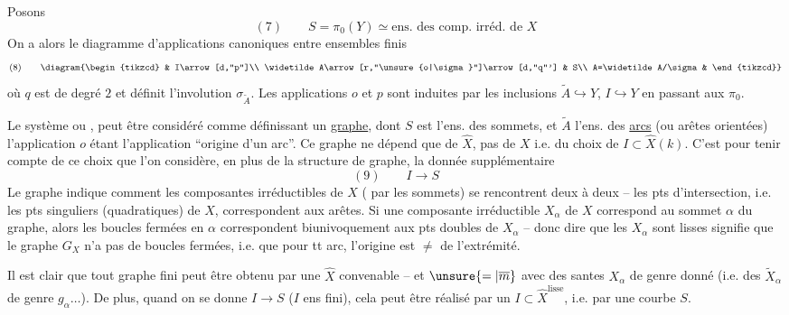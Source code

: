 Posons
\[
(7)\qquad S=\pi_0(Y)\simeq\text{ens. des comp. irréd. de }X
\]
On a alors le diagramme d'applications canoniques entre ensembles finis
\[
(8)\qquad
\diagram{\begin{tikzcd}
& I\arrow[d,"p"]\\
\widetilde A\arrow[r,"\unsure{o|\sigma}"]\arrow[d,"q"'] & S\\
A=\widetilde A/\sigma &
\end{tikzcd}}
\]
où $q$ est de degré $2$ et définit l'involution $\sigma_{\widetilde A}$. Les applications $o$ et $p$ sont induites par les inclusions $\widetilde A\hookrightarrow Y$, $I\hookrightarrow Y$ en passant aux $\pi_0$.

Le système
ou
, peut être considéré comme définissant un \uline{graphe}, dont $S$ est l'ens. des sommets, et $\widetilde A$ l'ens. des \uline{arcs} (ou arêtes orientées) l'application $o$ étant l'application ``origine d'un arc''. Ce graphe ne dépend que de $\widehat X$, pas de $X$ i.e. du choix de $I\subset\widehat X(k)$. C'est pour tenir compte de ce choix que l'on considère, en plus de la structure de graphe, la donnée supplémentaire
\[
(9)\qquad I\longrightarrow S
\]
Le graphe indique comment les composantes irréductibles de $X$ ( par les sommets) se rencontrent deux à deux -- les pts d'intersection, i.e. les pts singuliers (quadratiques) de $X$, correspondent aux arêtes. Si une composante irréductible $X_\alpha$ de $X$ correspond au sommet $\alpha$ du graphe, alors les boucles fermées en $\alpha$ correspondent biunivoquement aux pts doubles de $X_\alpha$ -- donc dire que les $X_\alpha$ sont lisses signifie que le graphe $G_X$ n'a pas de boucles fermées, i.e. que pour tt arc, l'origine est $\neq$ de l'extrémité.

Il est clair que tout graphe fini peut être obtenu   par une $\widehat X$ convenable -- et $\unsure{=|\overline m}$ avec des 
santes $X_\alpha$ de genre  donné (i.e. des $\widetilde X_\alpha$ de genre $g_\alpha\ldots$). De plus, quand on se donne  $I\to S$ ($I$ ens fini), cela peut être réalisé par un $I\subset\widehat X^{\mathrm{lisse}}$, i.e. par une courbe  $S$.

